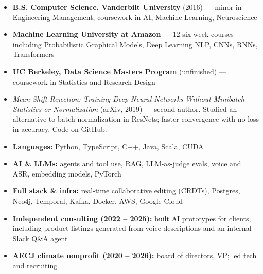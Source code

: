 \documentclass{my_cv}
\begin{document}

\begin{itemize}
\item \textbf{B.S. Computer Science, Vanderbilt University} (2016) --- minor in Engineering Management; coursework in AI, Machine Learning, Neuroscience
\item \textbf{Machine Learning University at Amazon} --- 12 six-week courses including Probabilistic Graphical Models, Deep Learning NLP, CNNs, RNNs, Transformers
\item \textbf{UC Berkeley, Data Science Masters Program} (unfinished) --- coursework in Statistics and Research Design
\end{itemize}


\begin{itemize}
\item \textit{Mean Shift Rejection: Training Deep Neural Networks Without Minibatch Statistics or Normalization} (arXiv, 2019) \href{https://arxiv.org/abs/1911.13173}{\faLink} --- second author. Studied an alternative to batch normalization in ResNets; faster convergence with no loss in accuracy. Code on GitHub.
\end{itemize}


\begin{itemize}
\item \textbf{Languages:} Python, TypeScript, C++, Java, Scala, CUDA
\item \textbf{AI \& LLMs:} agents and tool use, RAG, LLM-as-judge evals, voice and ASR, embedding models, PyTorch
\item \textbf{Full stack \& infra:} real-time collaborative editing (CRDTs), Postgres, Neo4j, Temporal, Kafka, Docker, AWS, Google Cloud
\end{itemize}


\begin{itemize}
\item \textbf{Independent consulting (2022 -- 2025):} built AI prototypes for clients, including product listings generated from voice descriptions and an internal Slack Q\&A agent
\item \textbf{AECJ climate nonprofit (2020 -- 2026):} board of directors, VP; led tech and recruiting
\end{itemize}
\end{document}
